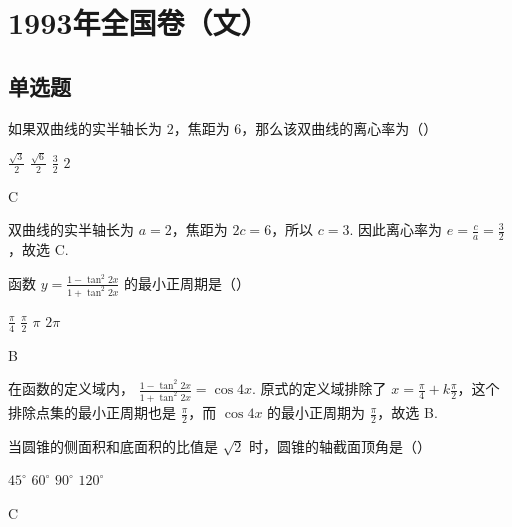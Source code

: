 \documentclass[UTF8,a4paper,oneside,11pt]{ctexbook}
\begin{document}
\mainmatter

\chapter{1993年全国卷（文）}
\section{单选题}

\begin{problem}
如果双曲线的实半轴长为 \(2\)，焦距为 \(6\)，那么该双曲线的离心率为（\quad）

\choices
    {\(\frac{\sqrt{3}}{2}\)}
    {\(\frac{\sqrt{6}}{2}\)}
    {\(\frac{3}{2}\)}
    {\(2\)}
\end{problem}

\begin{answer}
C
\end{answer}

\begin{solution}
双曲线的实半轴长为 \(a=2\)，焦距为 \(2c=6\)，所以 \(c=3\). 因此离心率为 \(e=\frac{c}{a}=\frac{3}{2}\)，故选 C.
\end{solution}

\begin{problem}
函数 \(y = \frac{1 - \tan^2 2x}{1 + \tan^2 2x} \) 的最小正周期是（\quad）

\choices
    {\(\frac{\pi}{4}\)}
    {\(\frac{\pi}{2}\)}
    {\(\pi\)}
    {\(2\pi\)}
\end{problem}

\begin{answer}
B
\end{answer}

\begin{solution}
在函数的定义域内，
\(\displaystyle \frac{1-\tan^2 2x}{1+\tan^2 2x}=\cos 4x\). 原式的定义域排除了 \(x=\frac{\pi}{4}+k\frac{\pi}{2}\)，这个排除点集的最小正周期也是 \(\frac{\pi}{2}\)，而 \(\cos 4x\) 的最小正周期为 \(\frac{\pi}{2}\)，故选 B.
\end{solution}

\begin{problem}
当圆锥的侧面积和底面积的比值是 \(\sqrt{2}\) 时，圆锥的轴截面顶角是（\quad）

\choices
    {\(45^{\circ}\)}
    {\(60^{\circ}\)}
    {\(90^{\circ}\)}
    {\(120^{\circ}\)}
\end{problem}

\begin{answer}
C
\end{answer}
\end{document}
